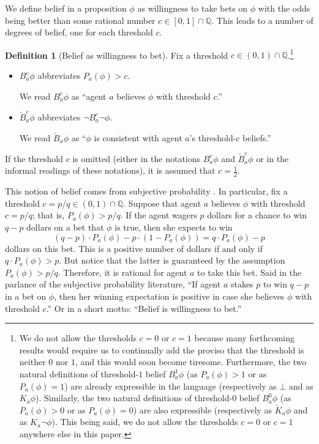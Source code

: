 \documentclass[12pt]{article}
\theoremstyle{definition}
\newtheorem{definition}[theorem]{Definition}
\newcommand{\Rat}{\mathbb{Q}}  %
\begin{document}
We define belief in a proposition $\phi$ as willingness to take bets
on $\phi$ with the odds being better than some rational number
$c\in[0,1]\cap\Rat$.  This leads to a number of degrees of belief, one
for each threshold $c$.

\begin{definition}[Belief as willingness to bet]
  Fix a threshold $c\in(0,1)\cap\Rat$.\footnote{We do not allow the
    thresholds $c=0$ or $c=1$ because many forthcoming results would
    require us to continually add the proviso that the threshold is
    neither $0$ nor $1$, and this would soon become tiresome.
    Furthermore, the two natural definitions of threshold-$1$ belief
    $B^1_a\phi$ (as $P_a(\phi)>1$ or as $P_a(\phi)=1$) are already
    expressible in the language (respectively as $\bot$ and as
    $K_a\phi$).  Similarly, the two natural definitions of
    threshold-$0$ belief $B^0_a\phi$ (as $P_a(\phi)>0$ or as
    $P_a(\phi)=0$) are also expressible (respectively as $\check
    K_a\phi$ and as $K_a\lnot\phi$).  This being said, we do not allow
    the thresholds $c=0$ or $c=1$ anywhere else in this paper.}
  \begin{itemize}
  \item $B_a^c\phi$ abbreviates $P_a(\phi)>c$.

    We read $B_a^c\phi$ as ``agent $a$ believes $\phi$ with threshold
    $c$.''

  \item $\check B_a^c\phi$ abbreviates $\lnot B_a^c\lnot\phi$.

    We read $\check B_a\phi$ as ``$\phi$ is consistent with agent
    $a$'s threshold-$c$ beliefs.''
  \end{itemize}
  If the threshold $c$ is omitted (either in the notations $B_a^c\phi$
  and $\check B_a^c\phi$ or in the informal readings of these
  notations), it is assumed that $c=\frac 12$.
\end{definition}

This notion of belief comes from subjective probability
\cite{Jeffrey2004:sptrt}.  In particular, fix a threshold
$c=p/q\in(0,1)\cap\Rat$.  Suppose that agent $a$ believes $\phi$ with
threshold $c=p/q$; that is, $P_a(\phi)>p/q$.  If the agent wagers $p$
dollars for a chance to win $q-p$ dollars on a bet that $\phi$ is
true, then she expects to win
\[
(q-p)\cdot P_a(\phi) - p\cdot(1-P_a(\phi)) = q\cdot P_a(\phi) - p
\]
dollars on this bet.  This is a positive number of dollars if and only
if $q\cdot P_a(\phi)>p$.  But notice that the latter is guaranteed by
the assumption $P_a(\phi)>p/q$.  Therefore, it is rational for agent
$a$ to take this bet.  Said in the parlance of the subjective
probability literature, ``If agent $a$ stakes $p$ to win $q-p$ in a
bet on $\phi$, then her winning expectation is positive in case she
believes $\phi$ with threshold $c$.''  Or in a short motto: ``Belief
is willingness to bet.''
\end{document}
